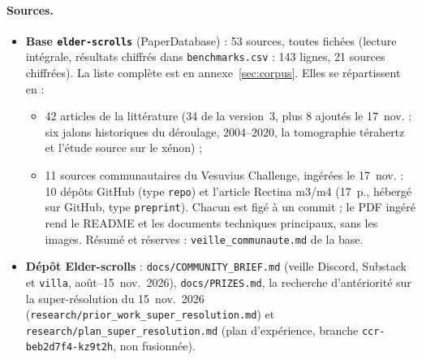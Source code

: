 \documentclass[11pt,a4paper]{article}
\begin{document}
\paragraph{Sources.}
\begin{itemize}
  \item \textbf{Base \texttt{elder-scrolls}} (PaperDatabase) : 53 sources, toutes fichées
  (lecture intégrale, résultats chiffrés dans \texttt{benchmarks.csv} : 143 lignes, 21 sources
  chiffrées). La liste complète est en annexe~\ref{sec:corpus}. Elles se répartissent en :
  \begin{itemize}
    \item 42 articles de la littérature (34 de la version~3, plus 8 ajoutés le 17~nov. :
    six jalons historiques du déroulage, 2004–2020, la tomographie térahertz et l'étude
    source sur le xénon) ;
    \item 11 sources communautaires du Vesuvius Challenge, ingérées le 17~nov. : 10 dépôts
    GitHub (type \texttt{repo}) et l'article Rectina m3/m4 (17~p., hébergé sur GitHub, type
    \texttt{preprint}). Chacun est figé à un commit ; le PDF ingéré rend le README et les
    documents techniques principaux, sans les images. Résumé et réserves :
    \nolinkurl{veille_communaute.md} de la base.
  \end{itemize}
  \item \textbf{Dépôt Elder-scrolls} : \nolinkurl{docs/COMMUNITY_BRIEF.md} (veille Discord,
  Substack et \texttt{villa}, août–15~nov.~2026), \nolinkurl{docs/PRIZES.md}, la recherche
  d'antériorité sur la super-résolution du 15~nov.~2026
  (\nolinkurl{research/prior_work_super_resolution.md}) et \nolinkurl{research/plan_super_resolution.md} (plan
  d'expérience, branche \texttt{ccr-beb2d7f4-kz9t2h}, non fusionnée).
\end{itemize}
\end{document}
